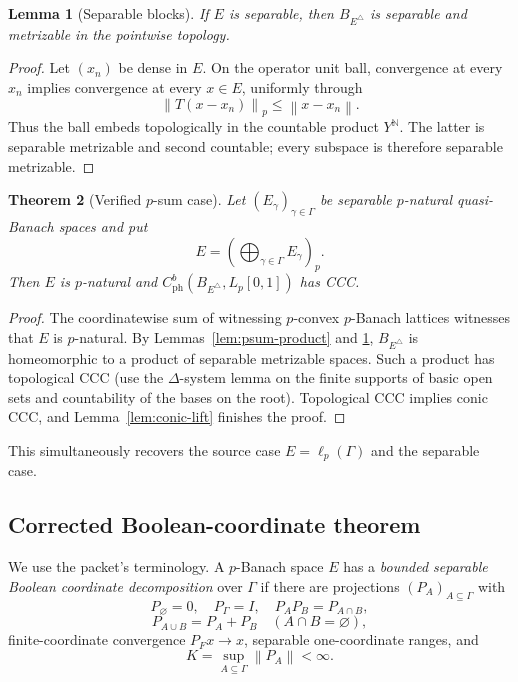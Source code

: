 \documentclass[11pt]{article}
\newtheorem{theorem}{Theorem}[section]
\newtheorem{lemma}[theorem]{Lemma}
\theoremstyle{definition}
\newcommand{\N}{\mathbb N}
\newcommand{\Lp}{L_p[0,1]}
\newcommand{\cph}{C_{\mathrm{ph}}^b}
\newcommand{\norm}[1]{\left\lVert #1\right\rVert}
\begin{document}
\begin{lemma}[Separable blocks]
\label{lem:sep-ball}
If $E$ is separable, then $B_{E^\triangle}$ is separable and metrizable in the
pointwise topology.
\end{lemma}

\begin{proof}
Let $(x_n)$ be dense in $E$.  On the operator unit ball, convergence at every
$x_n$ implies convergence at every $x\in E$, uniformly through
\[
 \norm{T(x-x_n)}_p\leq\norm{x-x_n}.
\]
Thus the ball embeds topologically in the countable product $Y^\N$.  The latter
is separable metrizable and second countable; every subspace is therefore
separable metrizable.
\end{proof}

\begin{theorem}[Verified $p$-sum case]
\label{thm:psum}
Let $(E_\gamma)_{\gamma\in\Gamma}$ be separable $p$-natural quasi-Banach spaces
and put
\[
 E=\left(\bigoplus_{\gamma\in\Gamma}E_\gamma\right)_p.
\]
Then $E$ is $p$-natural and $\cph(B_{E^\triangle},\Lp)$ has CCC.
\end{theorem}

\begin{proof}
The coordinatewise sum of witnessing $p$-convex $p$-Banach lattices witnesses
that $E$ is $p$-natural.  By Lemmas~\ref{lem:psum-product} and
\ref{lem:sep-ball}, $B_{E^\triangle}$ is homeomorphic to a product of separable
metrizable spaces.  Such a product has topological CCC (use the
$\Delta$-system lemma on the finite supports of basic open sets and countability
of the bases on the root).  Topological CCC implies conic CCC, and
Lemma~\ref{lem:conic-lift} finishes the proof.
\end{proof}

This simultaneously recovers the source case $E=\ell_p(\Gamma)$ and the
separable case.

\subsection{Corrected Boolean-coordinate theorem}

We use the packet's terminology.  A $p$-Banach space $E$ has a
\emph{bounded separable Boolean coordinate decomposition} over $\Gamma$ if
there are projections $(P_A)_{A\subseteq\Gamma}$ with
\[
 P_\varnothing=0,\quad P_\Gamma=I,\quad P_AP_B=P_{A\cap B},
\]
\[
 P_{A\cup B}=P_A+P_B\quad(A\cap B=\varnothing),
\]
finite-coordinate convergence $P_Fx\to x$, separable one-coordinate ranges,
and
\[
 K=\sup_{A\subseteq\Gamma}\norm{P_A}<\infty.
\]
\end{document}
